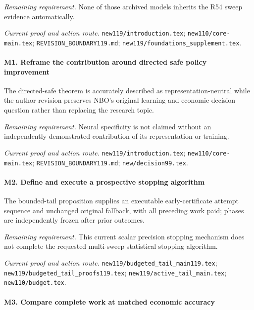 \par\emph{Remaining requirement.} None of those archived models inherits the R54 sweep evidence automatically.

\par\emph{Current proof and action route.} \nolinkurl{new119/introduction.tex}; \nolinkurl{new110/core-main.tex}; \nolinkurl{REVISION_BOUNDARY119.md}; \nolinkurl{new119/foundations_supplement.tex}.

\paragraph{M1. Reframe the contribution around directed safe policy improvement}

The directed-safe theorem is accurately described as representation-neutral while the author revision preserves NBO's original learning and economic decision question rather than replacing the research topic.

\par\emph{Remaining requirement.} Neural specificity is not claimed without an independently demonstrated contribution of its representation or training.

\par\emph{Current proof and action route.} \nolinkurl{new119/introduction.tex}; \nolinkurl{new110/core-main.tex}; \nolinkurl{REVISION_BOUNDARY119.md}; \nolinkurl{new/decision99.tex}.

\paragraph{M2. Define and execute a prospective stopping algorithm}

The bounded-tail proposition supplies an executable early-certificate attempt sequence and unchanged original fallback, with all preceding work paid; phases are independently frozen after prior outcomes.

\par\emph{Remaining requirement.} This current scalar precision stopping mechanism does not complete the requested multi-sweep statistical stopping algorithm.

\par\emph{Current proof and action route.} \nolinkurl{new119/budgeted_tail_main119.tex}; \nolinkurl{new119/budgeted_tail_proofs119.tex}; \nolinkurl{new119/active_tail_main.tex}; \nolinkurl{new110/budget.tex}.

\paragraph{M3. Compare complete work at matched economic accuracy}


